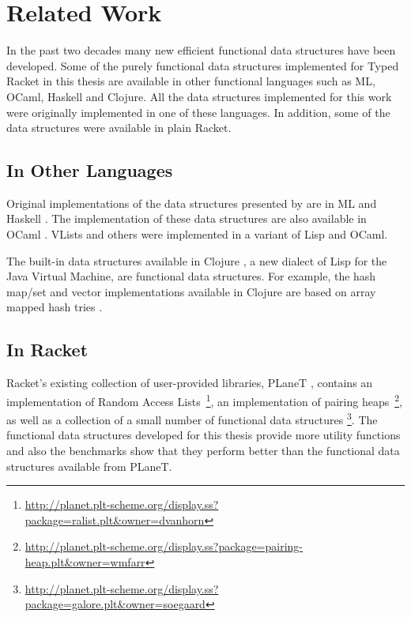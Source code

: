 \chapter{Related Work}

In the past two decades many new efficient functional data structures
have been developed. Some of the purely functional data structures
implemented for Typed Racket in this thesis are available in other
functional languages such as ML, OCaml, Haskell and Clojure. All the
data structures implemented for this work were originally implemented in
one of these languages. In addition, some of the data structures were
available in plain Racket.

\section{In Other Languages}

Original implementations of the data structures presented by \citet{oka}
are in ML and Haskell \citep{okas-mlhkl}. The implementation of these
data structures are also available in OCaml \citep{mottl}. VLists and
others \citep{bagwell-lists} were implemented in a variant of Lisp and
OCaml.

The built-in data structures available in Clojure \citep{hickey}, a new
dialect of Lisp for the Java Virtual Machine, are functional data
structures. For example, the hash map/set and vector implementations
available in Clojure are based on array mapped hash tries
\citep{bagwell-tries}.

\section{In Racket}


Racket's existing collection of user-provided libraries, PLaneT
\citep{planet}, contains an implementation of Random Access
Lists~\footnote{\url{http://planet.plt-scheme.org/display.ss?package=ralist.plt&owner=dvanhorn}},
an implementation of pairing
heaps~\footnote{\url{http://planet.plt-scheme.org/display.ss?package=pairing-heap.plt&owner=wmfarr}},
as well as a collection of a small number of functional data structures
\footnote{\url{http://planet.plt-scheme.org/display.ss?package=galore.plt&owner=soegaard}}. The
functional data structures developed for this thesis provide more
utility functions and also the benchmarks show that they perform better
than the functional data structures available from PLaneT.
